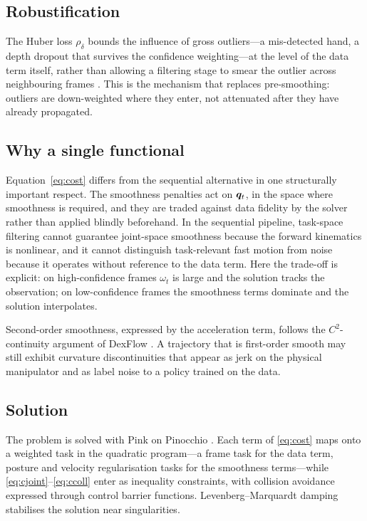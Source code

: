 \subsection{Robustification}

The Huber loss $\rho_\delta$ bounds the influence of gross outliers---a
mis-detected hand, a depth dropout that survives the confidence weighting---at
the level of the data term itself, rather than allowing a filtering stage to
smear the outlier across neighbouring frames \cite{dexteleop0}. This is the
mechanism that replaces pre-smoothing: outliers are down-weighted where they
enter, not attenuated after they have already propagated.

\subsection{Why a single functional}

Equation~\eqref{eq:cost} differs from the sequential alternative in one
structurally important respect. The smoothness penalties act on $\bm{q}_t$, in the
space where smoothness is required, and they are traded against data fidelity
by the solver rather than applied blindly beforehand. In the sequential
pipeline, task-space filtering cannot guarantee joint-space smoothness because
the forward kinematics is nonlinear, and it cannot distinguish task-relevant
fast motion from noise because it operates without reference to the data term.
Here the trade-off is explicit: on high-confidence frames $\omega_t$ is large
and the solution tracks the observation; on low-confidence frames the
smoothness terms dominate and the solution interpolates.

Second-order smoothness, expressed by the acceleration term, follows the
$C^2$-continuity argument of DexFlow \cite{dexflow}. A trajectory that is
first-order smooth may still exhibit curvature discontinuities that appear as
jerk on the physical manipulator and as label noise to a policy trained on the
data.

\subsection{Solution}

The problem is solved with Pink on Pinocchio \cite{pink}. Each term of
\eqref{eq:cost} maps onto a weighted task in the quadratic program---a frame
task for the data term, posture and velocity regularisation tasks for the
smoothness terms---while \eqref{eq:cjoint}--\eqref{eq:ccoll} enter as
inequality constraints, with collision avoidance expressed through control
barrier functions. Levenberg--Marquardt damping stabilises the solution near
singularities.


